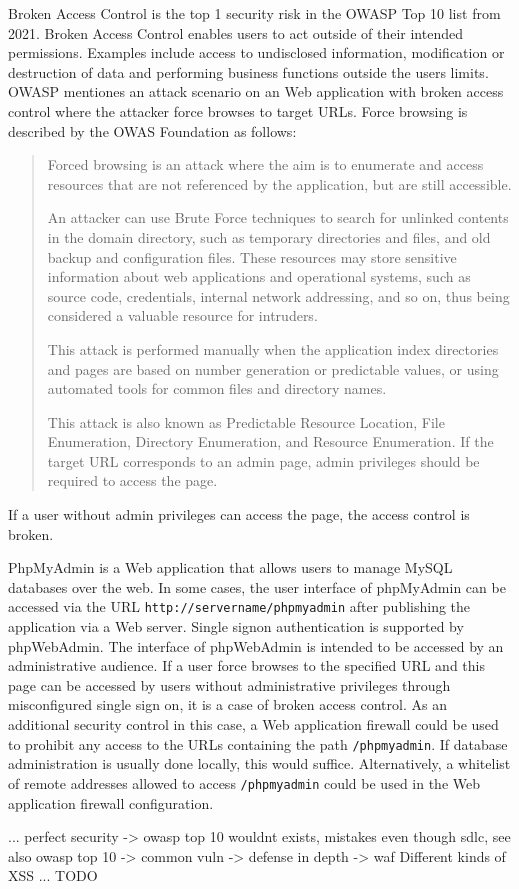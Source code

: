 Broken Access Control is the top 1 security risk in the OWASP Top 10 list from 2021.
Broken Access Control enables users to act outside of their intended permissions.
Examples include access to undisclosed information, modification or destruction of data and performing business functions outside the users limits.
OWASP mentiones an attack scenario on an Web application with broken access control where the attacker force browses to target URLs. \cite{OWASP/BrokenAccessControl} Force browsing is described by the OWAS Foundation as follows:
\begin{quote}
	Forced browsing is an attack where the aim is to enumerate and access resources that are not referenced by the application, but are still accessible.

	An attacker can use Brute Force techniques to search for unlinked contents in the domain directory, such as temporary directories and files, and old backup and configuration files. These resources may store sensitive information about web applications and operational systems, such as source code, credentials, internal network addressing, and so on, thus being considered a valuable resource for intruders.

	This attack is performed manually when the application index directories and pages are based on number generation or predictable values, or using automated tools for common files and directory names.

	This attack is also known as Predictable Resource Location, File Enumeration, Directory Enumeration, and Resource Enumeration.
	If the target URL corresponds to an admin page, admin privileges should be required to access the page. \cite{OWASP/forcebrowsing}
\end{quote}
If a user without admin privileges can access the page, the access control is broken. 

PhpMyAdmin is a Web application that allows users to manage MySQL databases over the web.
In some cases, the user interface of phpMyAdmin can be accessed via the URL \verb|http://servername/phpmyadmin| after publishing the application via a Web server. Single signon authentication is supported by phpWebAdmin. \cite{phpmyadmin/overview,phpmyadmin/quickinstall,ubuntu/phpmyadmin,phpmyadmin/signon}
The interface of phpWebAdmin is intended to be accessed by an administrative audience.
If a user force browses to the specified URL and this page can be accessed by users without administrative privileges through misconfigured single sign on, it is a case of broken access control.
As an additional security control in this case, a Web application firewall could be used to prohibit any access to the URLs containing the path \verb|/phpmyadmin|.
If database administration is usually done locally, this would suffice.
Alternatively, a whitelist of remote addresses allowed to access \verb|/phpmyadmin| could be used in the Web application firewall configuration.




...
	{\color{red} perfect security -> owasp top 10 wouldnt exists, mistakes even though sdlc, see also owasp top 10 -> common vuln -> defense in depth -> waf }
Different kinds of XSS ...
	{\color{red}TODO}
